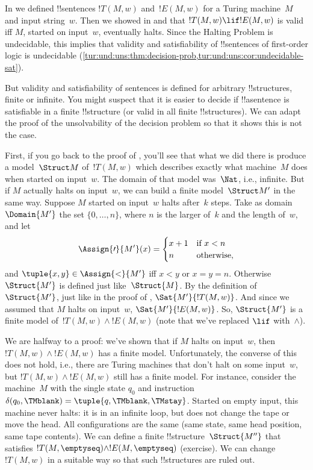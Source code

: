 \documentclass[../../../include/open-logic-section]{subfiles}
\begin{document}

\begin{explain}
  In  we defined !!{sentence}s $!T(M,w)$ and~$!E(M,w)$
  for a Turing machine~$M$ and input string~$w$. Then we showed in
   and 
  that $!T(M,w) \lif !E(M,w)$ is valid iff $M$, started on input~$w$,
  eventually halts. Since the Halting Problem is undecidable, this
  implies that validity and satisfiability of !!{sentence}s of
  first-order logic is undecidable
  (\cref{tur:und:uns:thm:decision-prob,tur:und:uns:cor:undecidable-sat}).

  But validity and satisfiability of sentences is defined for
  arbitrary !!{structure}s, finite or infinite. You might suspect that
  it is easier to decide if !!a{sentence} is satisfiable in a finite
  !!{structure} (or valid in all finite !!{structure}s). We can adapt
  the proof of the unsolvability of the decision problem so that it
  shows this is not the case.

  First, if you go back to the proof of
  , you'll see that what we did there is
  produce a model~$\Struct M$ of~$!T(M,w)$ which describes exactly
  what machine~$M$ does when started on input~$w$.  The domain of that
  model was~$\Nat$, i.e., infinite. But if $M$ actually halts on
  input~$w$, we can build a finite model~$\Struct M'$ in the same way.
  Suppose $M$ started on input~$w$ halts after~$k$ steps. Take as
  domain~$\Domain{M'}$ the set $\{0, \dots, n\}$, where $n$ is the
  larger of~$k$ and the length of~$w$, and let
  \[
    \Assign{\prime}{M'}(x) = 
    \begin{cases}
      x + 1 &\text{if $x < n$}\\
      n &\text{otherwise,}
    \end{cases}
  \]
  and $\tuple{x,y} \in \Assign{<}{M'}$ iff $x < y$ or $x = y = n$.
  Otherwise $\Struct{M'}$ is defined just like~$\Struct{M}$. By the
  definition of~$\Struct{M'}$, just like in the proof of
  , $\Sat{M'}{!T(M,w)}$.  And since we
  assumed that $M$ halts on input~$w$, $\Sat{M'}{!E(M,w)}$. So,
  $\Struct{M'}$ is a finite model of~$!T(M,w) \land !E(M,w)$ (note
  that we've replaced $\lif$ with~$\land$).
  
  We are halfway to a proof: we've shown that if $M$ halts on
  input~$w$, then $!T(M,w) \land !E(M,w)$ has a finite model.
  Unfortunately, the converse of this does not hold, i.e., there are
  Turing machines that don't halt on some input~$w$, but $!T(M,w)
  \land !E(M,w)$ still has a finite model. For instance, consider the
  machine~$M$ with the single state $q_0$ and instruction
  $\delta(q_0,\TMblank) = \tuple{q,\TMblank,\TMstay}$. Started on
  empty input, this machine never halts: it is in an infinite loop,
  but does not change the tape or move the head. All configurations
  are the same (same state, same head position, same tape contents).
  We can define a finite !!{structure}~$\Struct{M''}$ that satisfies
  $!T(M,\emptyseq) \land !E(M,\emptyseq)$ (exercise). We can
  change~$!T(M,w)$ in a suitable way so that such !!{structure}s
  are ruled out.


\end{explain}
\end{document}
